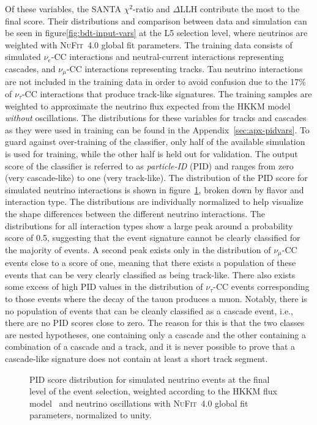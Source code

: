 Of these variables, the SANTA $\chi^2\textrm{-ratio}$ and $\Delta$LLH contribute the most to the final score. Their distributions and comparison between data and simulation can be seen in figure\ref{fig:bdt-input-vars} at the L5 selection level, where neutrinos are weighted with \textsc{NuFit}~4.0\cite{nufit40} global fit parameters.
The training data consists of simulated $\nu_e$-CC interactions and neutral-current interactions representing cascades, and $\nu_\mu$-CC interactions representing tracks. Tau neutrino interactions are not included in the training data in order to avoid confusion due to the 17\% of $\nu_\tau$-CC interactions that produce track-like signatures. The training samples are weighted to approximate the neutrino flux expected from the HKKM model~ \emph{without} oscillations. The distributions for these variables for tracks and cascades as they were used in training can be found in the Appendix~\ref{sec:apx-pidvars}. To guard against over-training of the classifier, only half of the available simulation is used for training, while the other half is held out for validation. The output score of the classifier is referred to as \emph{particle-ID} (PID) and ranges from zero (very cascade-like) to one (very track-like). The distribution of the PID score for simulated neutrino interactions is shown in figure~\ref{fig:pid-score}, broken down by flavor and interaction type. The distributions are individually normalized to help visualize the shape differences between the different neutrino interactions. The distributions for all interaction types show a large peak around a probability score of 0.5, suggesting that the event signature cannot be clearly classified for the majority of events. A second peak exists only in the distribution of $\nu_\mu$-CC events close to a score of one, meaning that there exists a population of these events that can be very clearly classified as being track-like. There also exists some excess of high PID values in the distribution of $\nu_\tau$-CC events corresponding to those events where the decay of the tauon produces a muon. Notably, there is no population of events that can be cleanly classified as a cascade event, i.e., there are no PID scores close to zero. The reason for this is that the two classes are nested hypotheses, one containing only a cascade and the other containing a combination of a cascade and a track, and it is never possible to prove that a cascade-like signature does not contain at least a short track segment.
\begin{figure}
    \centering
    
    \caption{PID score distribution for simulated neutrino events at the final level of the event selection, weighted according to the HKKM flux model~\cite{Honda:2015fha} and neutrino oscillations with \textsc{NuFit}~4.0\cite{nufit40} global fit parameters, normalized to unity.}
    \label{fig:pid-score}
\end{figure}

